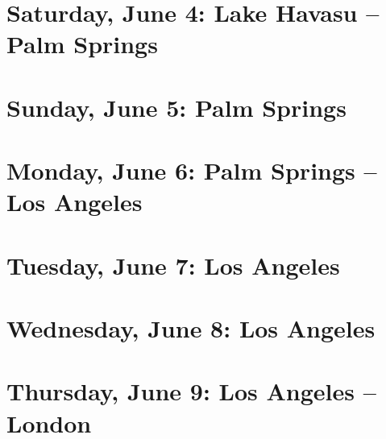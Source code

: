 \documentclass[b5paper,11pt,titlepage,draft]{book}
\begin{document}
\chapter{Saturday, June 4:  Lake Havasu -- Palm Springs}
\chapter{Sunday, June 5:  Palm Springs}
\chapter{Monday, June 6:  Palm Springs -- Los Angeles}
\chapter{Tuesday, June 7:  Los Angeles}
\chapter{Wednesday, June 8: Los Angeles}
\chapter{Thursday, June 9: Los Angeles -- London}
\end{document}

